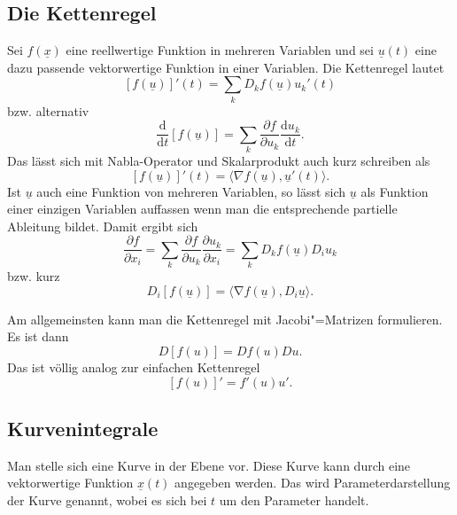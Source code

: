 \documentclass[a4paper,10pt,fleqn,twocolumn,twoside]{article}
\begin{document}
\subsection{Die Kettenregel}

Sei $f(\underline x)$ eine reellwertige Funktion in mehreren
Variablen und sei $\underline u(t)$ eine dazu passende
vektorwertige Funktion in einer Variablen. Die Kettenregel lautet
\[[f(\underline u)]'(t) = \sum_k D_kf(\underline u)u_k'(t)\]
bzw. alternativ
\[\frac{\mathrm d}{\mathrm dt}[f(\underline u)]
= \sum_k \frac{\partial f}{\partial u_k}\frac{\mathrm du_k}{\mathrm dt}.\]
\noindent
Das lässt sich mit Nabla-Operator und Skalarprodukt auch kurz schreiben als
\[[f(\underline u)]'(t)
= \langle\nabla f(\underline u),\underline u'(t)\rangle.\]
Ist $\underline u$ auch eine Funktion von mehreren Variablen,
so lässt sich $\underline u$
als Funktion einer einzigen Variablen auffassen wenn man die entsprechende
partielle Ableitung bildet. Damit ergibt sich
\[\frac{\partial f}{\partial x_i}
= \sum_k\frac{\partial f}{\partial u_k}\frac{\partial u_k}{\partial x_i}
= \sum_k D_k f(\underline u) D_i u_k\]
bzw. kurz
\[D_i [f(\underline u)] = \langle\mathrm \nabla f(\underline u),
D_i\underline u\rangle.\]

\noindent
Am allgemeinsten kann man die Kettenregel mit Jacobi"=Matrizen
formulieren.
Es ist dann
\[D[f(u)] = Df(u)Du.\]
\noindent
Das ist völlig analog zur einfachen Kettenregel
\[[f(u)]' = f'(u)u'.\]

\subsection{Kurvenintegrale}

Man stelle sich eine Kurve in der Ebene vor. Diese Kurve kann durch
eine vektorwertige Funktion $\underline x(t)$ angegeben werden.
Das wird Parameterdarstellung der Kurve genannt, wobei es sich bei
$t$ um den Parameter handelt.
\end{document}
